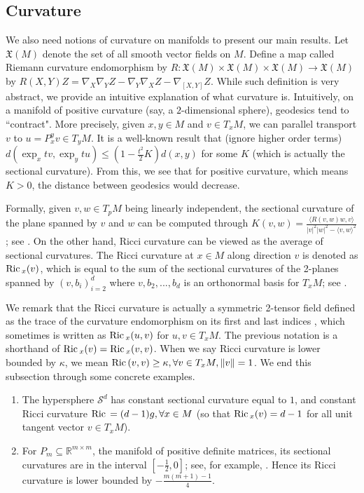 \subsection{Curvature}\label{sec:ricci}
We also need notions of curvature on manifolds to present our main results. Let $\mathfrak{X}(M)$ denote the set of all smooth vector fields on $M$.
Define a map called Riemann curvature endomorphism by $R: \mathfrak{X}(M) \times \mathfrak{X}(M) \times \mathfrak{X}(M) \to \mathfrak{X}(M)$ by  $R(X, Y)Z = \nabla_{X} \nabla_{Y} Z - \nabla_{Y} \nabla_{X} Z - \nabla_{[X, Y]} Z.$ While such definition is very abstract, we provide an intuitive explanation of what curvature is.
Intuitively, on a manifold of positive curvature (say, a $2$-dimensional sphere), geodesics tend to ``contract". More precisely, given $x, y \in M$ and $v \in T_{x}M$, we can parallel transport $v$ to $u = P_{x}^{y}v \in T_{y}M$. It is a well-known result that (ignore higher order terms) $d(\exp_{x}t v, \exp_{y} tu) \le (1-\frac{t^{2}}{2}K)d(x, y)$ for some $K$ (which is actually the sectional curvature). From this, we see that for positive curvature, which means $K > 0$, the distance between geodesics would decrease. 

Formally, given $v, w \in T_{p}M$ being linearly independent, the sectional curvature of the plane spanned by $v$ and $w$ can be computed through  $K(v, w) = \frac{\langle R(v, w)w, v \rangle}{|v|^{2}|w|^{2} - \langle v, w \rangle^{2}} $; see  \citet[Proposition 8.29]{lee2018introduction}. 
On the other hand, Ricci curvature can be viewed as the average of sectional curvatures. The Ricci curvature at $x \in M$ along direction $v$ is denoted as $\operatorname{Ric\,}_{x}(v)$, which is equal to the sum of the sectional curvatures of the 2-planes spanned by $(v, b_{i})_{i = 2}^{d}$ where $v, b_{2}, ..., b_{d}$ is an orthonormal basis for $T_{x}M$; see
\citet[Proposition 8.32]{lee2018introduction}. 

We remark that the Ricci curvature is actually a symmetric 2-tensor field defined as the trace of the
curvature endomorphism on its first and last indices \citep{lee2018introduction}, which sometimes is written as $\operatorname{Ric\,}_{x}(u, v)$ for $u, v \in T_{x}M$. The previous notation is a shorthand of $\operatorname{Ric\,}_{x}(v) = \operatorname{Ric\,}_{x}(v, v)$. When we say Ricci curvature is lower bounded by $\kappa$, we mean $\operatorname{Ric\,}(v, v) \ge \kappa, \forall v \in T_{x}M, \|v\| = 1$. We end this subsection through some concrete examples. 
\begin{enumerate}
    \item The hypersphere $\mathcal{S}^{d}$ has constant sectional curvature equal to $1$, and constant Ricci curvature $\operatorname{Ric\,} = (d-1) g, \forall x \in M$ (so that $\operatorname{Ric\,}_{x}(v) = d-1$ for all unit tangent vector $v \in T_{x}M$).
    \item For $P_{m} \subseteq \mathbb{R}^{m \times m}$, the manifold of positive definite matrices, its sectional curvatures are in the interval $[-\frac{1}{2}, 0]$; see, for example, \cite{criscitiello2023accelerated}. Hence its Ricci curvature is lower bounded by $-\frac{m(m+1)-1}{4}$.
\end{enumerate}


